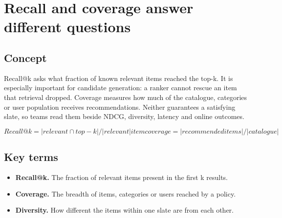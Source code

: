 \section{Recall and coverage answer different questions}

\begin{abstract}
Recall checks whether good items survived; coverage checks whether the system has breadth.
\end{abstract}

\subsection{Concept}
Recall@k asks what fraction of known relevant items reached the top-k. It is especially important for candidate generation: a ranker cannot rescue an item that retrieval dropped. Coverage measures how much of the catalogue, categories or user population receives recommendations. Neither guarantees a satisfying slate, so teams read them beside NDCG, diversity, latency and online outcomes.

\begin{equation*}
Recall@k = |relevant ∩ top-k| / |relevant|      item coverage = |recommended items| / |catalogue|
\end{equation*}

\subsection{Key terms}
\begin{itemize}
\item \textbf{Recall@k.} The fraction of relevant items present in the first k results.
\item \textbf{Coverage.} The breadth of items, categories or users reached by a policy.
\item \textbf{Diversity.} How different the items within one slate are from each other.
\end{itemize}
